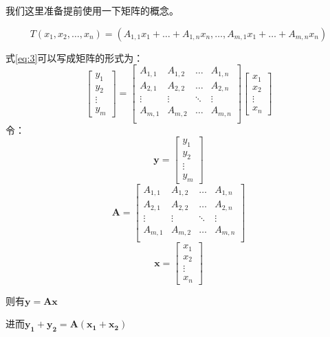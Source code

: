 \documentclass[10pt,a4paper,UTF8]{article}
\begin{document}
\begin{answer}
我们这里准备提前使用一下矩阵的概念。

\begin{equation}
\label{eq:3}
T(x_{1},x_{2},\ldots ,x_{n}) = (A_{1,1}x_{1} + \ldots  + A_{1,n}x_{n}, \ldots , A_{m,1}x_{1} + \ldots + A_{m,n}x_{n})
\end{equation}


式\ref{eq:3}可以写成矩阵的形式为：
\begin{equation}
\label{eq:4}
\begin{bmatrix}
y_{1} \\ y_{2} \\ \vdots \\ y_{m}
\end{bmatrix}
=
\begin{bmatrix}
A_{1,1} & A_{1,2}  & \ldots & A_{1,n} \\
A_{2,1} & A_{2,2}  & \ldots & A_{2,n} \\
\vdots & \vdots  & \ddots & \vdots \\
A_{m,1} & A_{m,2}  & \ldots & A_{m,n} \\
\end{bmatrix}
\begin{bmatrix}
x_{1} \\ x_{2} \\ \vdots \\ x_{n}
\end{bmatrix}
\end{equation}
令：
\begin{equation}
\label{eq:7}
\mathbf{y} = 
\begin{bmatrix}
y_{1} \\ y_{2} \\ \vdots \\ y_{m}
\end{bmatrix}
\end{equation}
\begin{equation}
\label{eq:5}
\mathbf{A} = 
\begin{bmatrix}
A_{1,1} & A_{1,2}  & \ldots & A_{1,n} \\
A_{2,1} & A_{2,2}  & \ldots & A_{2,n} \\
\vdots & \vdots  & \ddots & \vdots \\
A_{m,1} & A_{m,2}  & \ldots & A_{m,n} \\
\end{bmatrix}
\end{equation}
\begin{equation}
\label{eq:6}
\mathbf{x} = 
\begin{bmatrix}
x_{1} \\ x_{2} \\ \vdots \\ x_{n}
\end{bmatrix}
\end{equation}

则有\(\mathbf{y} = \mathbf{Ax}\)

进而\(\mathbf{y_{1} + y_{2}} = \mathbf{A(x_{1} + x_{2})}\)
\end{answer}
\end{document}
